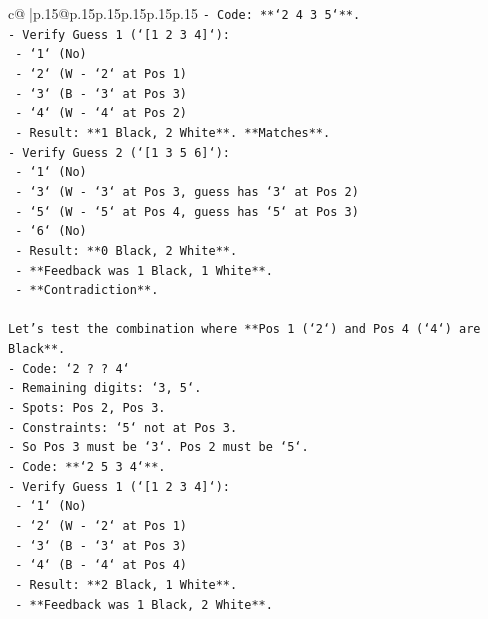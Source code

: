 \documentclass{article}
\begin{document}
{\begin{supertabular}{c@{$\;$}|p{.15\linewidth}@{}p{.15\linewidth}p{.15\linewidth}p{.15\linewidth}p{.15\linewidth}p{.15\linewidth}}
{{{\texttt{{-}   Code: **`2 4 3 5`**.} \\
\texttt{{-}   Verify Guess 1 (`{[}1 2 3 4{]}`):} \\
\texttt{    {-}   `1` (No)} \\
\texttt{    {-}   `2` (W {-} `2` at Pos 1)} \\
\texttt{    {-}   `3` (B {-} `3` at Pos 3)} \\
\texttt{    {-}   `4` (W {-} `4` at Pos 2)} \\
\texttt{    {-}   Result: **1 Black, 2 White**. **Matches**.} \\
\texttt{{-}   Verify Guess 2 (`{[}1 3 5 6{]}`):} \\
\texttt{    {-}   `1` (No)} \\
\texttt{    {-}   `3` (W {-} `3` at Pos 3, guess has `3` at Pos 2)} \\
\texttt{    {-}   `5` (W {-} `5` at Pos 4, guess has `5` at Pos 3)} \\
\texttt{    {-}   `6` (No)} \\
\texttt{    {-}   Result: **0 Black, 2 White**.} \\
\texttt{    {-}   **Feedback was 1 Black, 1 White**.} \\
\texttt{    {-}   **Contradiction**.} \\
\\ 
\texttt{Let's test the combination where **Pos 1 (`2`) and Pos 4 (`4`) are Black**.} \\
\texttt{{-}   Code: `2 ? ? 4`} \\
\texttt{{-}   Remaining digits: `3, 5`.} \\
\texttt{{-}   Spots: Pos 2, Pos 3.} \\
\texttt{{-}   Constraints: `5` not at Pos 3.} \\
\texttt{{-}   So Pos 3 must be `3`. Pos 2 must be `5`.} \\
\texttt{{-}   Code: **`2 5 3 4`**.} \\
\texttt{{-}   Verify Guess 1 (`{[}1 2 3 4{]}`):} \\
\texttt{    {-}   `1` (No)} \\
\texttt{    {-}   `2` (W {-} `2` at Pos 1)} \\
\texttt{    {-}   `3` (B {-} `3` at Pos 3)} \\
\texttt{    {-}   `4` (B {-} `4` at Pos 4)} \\
\texttt{    {-}   Result: **2 Black, 1 White**.} \\
\texttt{    {-}   **Feedback was 1 Black, 2 White**.} \\
}}}
\end{supertabular}}
\end{document}
